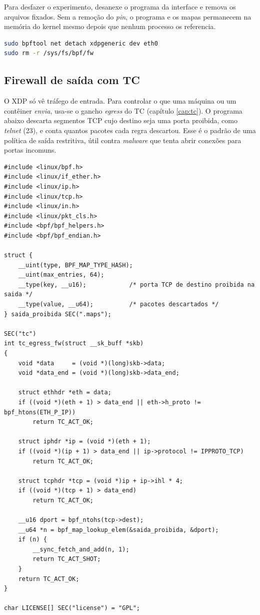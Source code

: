 Para desfazer o experimento, desanexe o programa da interface e remova os arquivos
fixados. Sem a remoção do \textit{pin}, o programa e os mapas permanecem na memória
do kernel mesmo depois que nenhum processo os referencia.

\begin{lstlisting}[language=bash, caption={Desanexação e limpeza.}, label=lst:seg-detach]
sudo bpftool net detach xdpgeneric dev eth0
sudo rm -r /sys/fs/bpf/fw
\end{lstlisting}

\subsection*{Firewall de saída com TC}

O XDP só vê tráfego de entrada. Para controlar o que uma máquina ou um contêiner
\textit{envia}, usa-se o gancho \textit{egress} do TC (capítulo \ref{cap:tc}). O
programa abaixo descarta segmentos TCP cujo destino seja uma porta proibida, como
\textit{telnet} (23), e conta quantos pacotes cada regra descartou. Esse é o padrão de
uma política de saída restritiva, útil contra \textit{malware} que tenta abrir
conexões para portas incomuns.

\begin{lstlisting}[caption={Firewall de saída em TC (tc\_egress\_fw.bpf.c).}, label=lst:seg-tc-egress]
#include <linux/bpf.h>
#include <linux/if_ether.h>
#include <linux/ip.h>
#include <linux/tcp.h>
#include <linux/in.h>
#include <linux/pkt_cls.h>
#include <bpf/bpf_helpers.h>
#include <bpf/bpf_endian.h>

struct {
    __uint(type, BPF_MAP_TYPE_HASH);
    __uint(max_entries, 64);
    __type(key, __u16);            /* porta TCP de destino proibida na saida */
    __type(value, __u64);          /* pacotes descartados */
} saida_proibida SEC(".maps");

SEC("tc")
int tc_egress_fw(struct __sk_buff *skb)
{
    void *data     = (void *)(long)skb->data;
    void *data_end = (void *)(long)skb->data_end;

    struct ethhdr *eth = data;
    if ((void *)(eth + 1) > data_end || eth->h_proto != bpf_htons(ETH_P_IP))
        return TC_ACT_OK;

    struct iphdr *ip = (void *)(eth + 1);
    if ((void *)(ip + 1) > data_end || ip->protocol != IPPROTO_TCP)
        return TC_ACT_OK;

    struct tcphdr *tcp = (void *)ip + ip->ihl * 4;
    if ((void *)(tcp + 1) > data_end)
        return TC_ACT_OK;

    __u16 dport = bpf_ntohs(tcp->dest);
    __u64 *n = bpf_map_lookup_elem(&saida_proibida, &dport);
    if (n) {
        __sync_fetch_and_add(n, 1);
        return TC_ACT_SHOT;
    }
    return TC_ACT_OK;
}

char LICENSE[] SEC("license") = "GPL";
\end{lstlisting}

